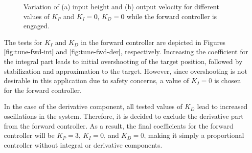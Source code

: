 \begin{figure}[H]
  \centering
  \caption{Variation of (a) input height and (b) output velocity for different values of $K_{P}$ and $K_I=0$, $K_D=0$ while the forward controller is engaged.}\label{fig:tune-fwd-prop}
\end{figure}


The tests for $K_I$ and $K_D$ in the forward controller are depicted in Figures \ref{fig:tune-fwd-int} and \ref{fig:tune-fwd-der}, respectively. Increasing the coefficient for the integral part leads to initial overshooting of the target position, followed by stabilization and approximation to the target. However, since overshooting is not desirable in this application due to safety concerns, a value of $K_I=0$ is chosen for the forward controller. 

In the case of the derivative component, all tested values of $K_D$ lead to increased oscillations in the system. Therefore, it is decided to exclude the derivative part from the forward controller. As a result, the final coefficients for the forward controller will be $K_P=3$, $K_I=0$, and $K_D=0$, making it simply a proportional controller without integral or derivative components.


